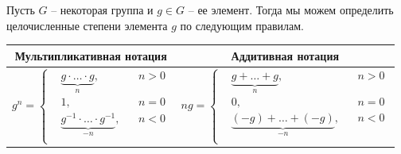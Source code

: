 Пусть $G$ -- некоторая группа и $g\in G$ -- ее элемент.
Тогда мы можем определить целочисленные степени элемента $g$ по следующим правилам.
\begin{center}
\begin{tabular}{c | c}
{Мультипликативная нотация}&{Аддитивная нотация}\\
\hline
{
$
g^n =
\left\{
\begin{aligned}
&\underbrace{g\cdot \ldots \cdot g}_n,&&n>0\\
&1,&&n=0\\
&\underbrace{g^{-1}\cdot \ldots \cdot g^{-1}}_{-n},&&n<0\\
\end{aligned}
\right.
$
}&{
$
n g =
\left\{
\begin{aligned}
&\underbrace{g+ \ldots + g}_n,&&n>0\\
&0,&&n=0\\
&\underbrace{(-g) + \ldots +(- g)}_{-n},&&n<0\\
\end{aligned}
\right.
$
}\\
\end{tabular}
\end{center}

